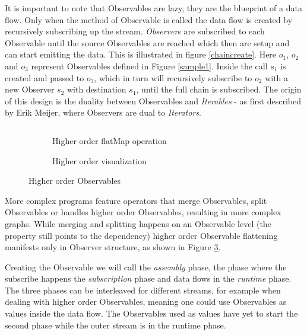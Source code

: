 It is important to note that Observables are lazy, they are the blueprint of a data flow. Only when the  method of Observable is called the data flow is created by recursively subscribing up the stream. \textit{Observer}s are subscribed to each Observable until the source Observables are reached which then are setup and can start emitting the data.
This is illustrated in figure \ref{chaincreate}. Here $o_1$, $o_2$ and $o_3$ represent Observables defined in Figure \ref{sample1}. Inside the  call $s_1$ is created and passed to $o_3$, which in turn will recursively subscribe to $o_2$ with a new Observer $s_2$ with destination $s_1$, until the full chain is subscribed.
The origin of this design is the duality between Observables and \textit{Iterables} - as first described by Erik Meijer, where Observers are dual to \textit{Iterators}.

\begin{figure}

\begin{subfigure}[a]{\columnwidth}
\inputminted[tabsize=2]{javascript}{listings/sample3.js}	
\caption{Higher order flatMap operation}
\label{sample3}
\end{subfigure}

\begin{subfigure}[b]{\columnwidth}
\centering

\caption{Higher order visualization}
\label{chainhigher}
\end{subfigure}

\caption{Higher order Observables}

\end{figure}

More complex programs feature operators that merge Observables, split Observables or handles higher order Observables, resulting in more complex graphs. While merging and splitting happens on an Observable level (the  property still points to the dependency) higher order Observable flattening manifests only in Observer structure, as shown in Figure \ref{chainhigher}.

Creating the Observable we will call the \textit{assembly} phase, the phase where the subscribe happens the \textit{subscription} phase and data flows in the \textit{runtime} phase. The three phases can be interleaved for different streams, for example when dealing with higher order Observables,  meaning one could use Observables as values inside the data flow. The Observables used as values have yet to start the second phase while the outer stream is in the runtime phase.
